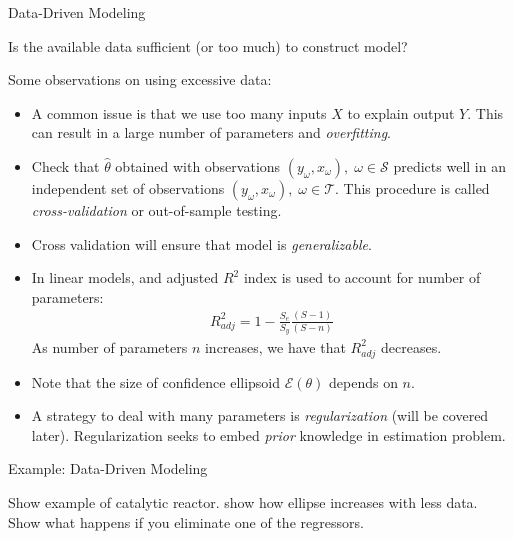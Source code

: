 \documentclass[9pt]{beamer}
\begin{document}
%
\begin{frame}{Data-Driven Modeling}

\begin{block}{}
Is the available data sufficient (or too much) to construct model?
\end{block}
Some observations on using excessive data:
\begin{itemize}
\item A common issue is that we use too many inputs $X$ to explain output $Y$. This can result in a large number of parameters and {\em overfitting}. 
\item Check that $\hat{\theta}$ obtained with observations $(y_\omega,x_\omega),\; \omega \in \mathcal{S}$ predicts well in an independent set of observations $(y_\omega,x_\omega),\; \omega \in \mathcal{T}$. This procedure is called {\em cross-validation} or out-of-sample testing. 
\item Cross validation will ensure that model is {\em generalizable}. 
\item In linear models, and adjusted $R^2$ index is used to account for number of parameters:
\begin{align*}
R^2_{adj}=1-\frac{S_e}{S_y}\frac{(S-1)}{(S-n)}
\end{align*}
As number of parameters $n$ increases, we have that $R^2_{adj}$ decreases. 
\item Note that the size of confidence ellipsoid $\mathcal{E}(\theta)$ depends on $n$.
\item A strategy to deal with many parameters is {\em regularization} (will be covered later). Regularization seeks to embed {\em prior} knowledge in estimation problem. 
\end{itemize}

\end{frame}

%
\begin{frame}{Example: Data-Driven Modeling}

\begin{block}{}
Show example of catalytic reactor. show how ellipse increases with less data. Show what happens if you eliminate one of the regressors. 
\end{block}

\end{frame}
\end{document}
